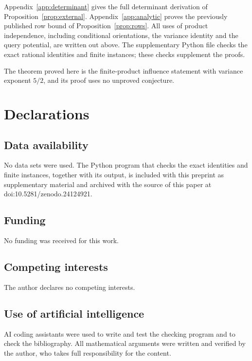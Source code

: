 \documentclass[11pt,reqno]{amsart}
\theoremstyle{definition}
\theoremstyle{remark}
\numberwithin{equation}{section}
\begin{document}
Appendix~\ref{app:determinant} gives the full determinant derivation of
Proposition~\ref{prop:external}.
Appendix~\ref{app:analytic} proves the previously published row bound
of Proposition~\ref{prop:rows}.
All uses of product independence, including conditional orientations,
the variance identity and the query potential, are written out above.
The supplementary Python file checks the exact rational identities and
finite instances; these checks supplement the proofs.

The theorem proved here is the finite-product influence statement with
variance exponent $5/2$, and its proof uses no unproved conjecture.

\section*{Declarations}

\subsection*{Data availability} No data sets were used. The Python program that checks the exact identities and finite instances, together with its output, is included with this preprint as supplementary material and archived with the source of this paper at doi:10.5281/zenodo.24124921.

\subsection*{Funding} No funding was received for this work.

\subsection*{Competing interests} The author declares no competing interests.

\subsection*{Use of artificial intelligence} AI coding assistants were used to write and test the checking program and to check the bibliography. All mathematical arguments were written and verified by the author, who takes full responsibility for the content.
\end{document}
